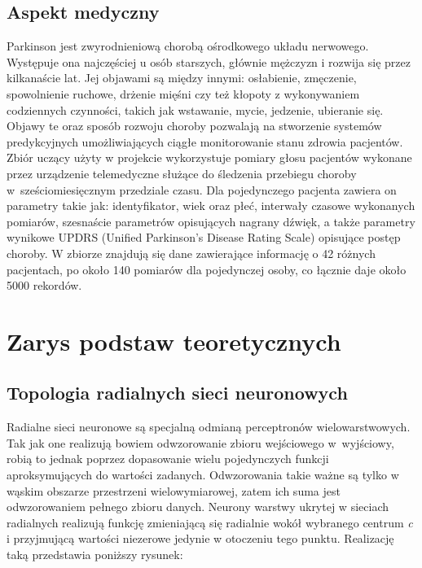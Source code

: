 \documentclass[12pt]{article}
\begin{document}
\subsection{Aspekt medyczny}

Parkinson jest zwyrodnieniową chorobą ośrodkowego układu nerwowego. Występuje ona najczęściej u osób starszych, głównie mężczyzn i rozwija się przez kilkanaście lat. Jej objawami są między innymi: osłabienie, zmęczenie, spowolnienie ruchowe, drżenie mięśni czy też kłopoty z wykonywaniem codziennych czynności, takich jak wstawanie, mycie, jedzenie, ubieranie się.  Objawy te oraz sposób rozwoju choroby pozwalają na stworzenie systemów predykcyjnych umożliwiających ciągłe monitorowanie stanu zdrowia pacjentów. Zbiór uczący użyty w projekcie wykorzystuje pomiary głosu pacjentów wykonane przez urządzenie telemedyczne służące do śledzenia przebiegu choroby w~sześciomiesięcznym przedziale czasu. Dla pojedynczego pacjenta zawiera on parametry takie jak: identyfikator, wiek oraz płeć, interwały czasowe wykonanych pomiarów, szesnaście parametrów opisujących nagrany dźwięk, a także parametry wynikowe UPDRS (Unified Parkinson's Disease Rating Scale) opisujące postęp choroby. W zbiorze znajdują się dane zawierające informację o 42 różnych pacjentach, po około 140 pomiarów dla pojedynczej osoby, co łącznie daje około 5000 rekordów.

\section{Zarys podstaw teoretycznych}

\subsection{Topologia radialnych sieci neuronowych}

Radialne sieci neuronowe są specjalną odmianą perceptronów wielowarstwowych. Tak jak one realizują bowiem odwzorowanie zbioru wejściowego w~wyjściowy, robią to jednak poprzez dopasowanie wielu pojedynczych funkcji aproksymujących do wartości zadanych. Odwzorowania takie ważne są tylko w wąskim obszarze przestrzeni wielowymiarowej, zatem ich suma jest odwzorowaniem pełnego zbioru danych. Neurony warstwy ukrytej w sieciach radialnych realizują funkcję zmieniającą się radialnie wokół wybranego centrum \textsl{c} i przyjmującą wartości niezerowe jedynie w otoczeniu tego punktu. Realizację taką przedstawia poniższy rysunek:
\end{document}
